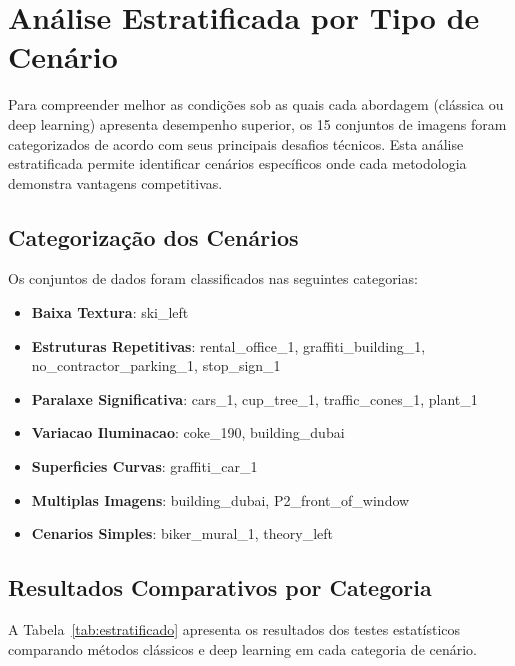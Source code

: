 \section{Análise Estratificada por Tipo de Cenário}

Para compreender melhor as condições sob as quais cada abordagem (clássica ou deep learning) apresenta desempenho superior, os 15 conjuntos de imagens foram categorizados de acordo com seus principais desafios técnicos. Esta análise estratificada permite identificar cenários específicos onde cada metodologia demonstra vantagens competitivas.

\subsection{Categorização dos Cenários}

Os conjuntos de dados foram classificados nas seguintes categorias:

\begin{itemize}
    \item \textbf{Baixa Textura}: ski_left
    \item \textbf{Estruturas Repetitivas}: rental_office_1, graffiti_building_1, no_contractor_parking_1, stop_sign_1
    \item \textbf{Paralaxe Significativa}: cars_1, cup_tree_1, traffic_cones_1, plant_1
    \item \textbf{Variacao Iluminacao}: coke_190, building_dubai
    \item \textbf{Superficies Curvas}: graffiti_car_1
    \item \textbf{Multiplas Imagens}: building_dubai, P2_front_of_window
    \item \textbf{Cenarios Simples}: biker_mural_1, theory_left
\end{itemize}

\subsection{Resultados Comparativos por Categoria}

A Tabela~\ref{tab:estratificado} apresenta os resultados dos testes estatísticos comparando métodos clássicos e deep learning em cada categoria de cenário.

